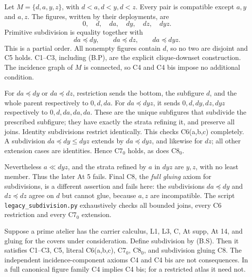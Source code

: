 \begin{counterexample}
\label{SA21-B-C-carriers}
Let \(M=\{d,a,y,z\}\), with \(d<a,d<y,d<z\).
Every pair is compatible except \(a,y\) and \(a,z\).
The figures, written by their deployments, are
\[
 0,\quad d,\quad da,\quad dy,\quad dz,\quad dyz.
\]
Primitive subdivision is equality together with
\[
 da\preceq dy,\qquad da\preceq dz,\qquad da\preceq dyz.
\]
This is a partial order. All nonempty figures contain \(d\),
so no two are disjoint and C5 holds. C1--C3, including (B.P),
are the explicit clique-downset construction. The incidence
graph of \(M\) is connected, so C4 and C4 bis impose no additional
condition.

For \(da\preceq dy\) or \(da\preceq dz\), restriction sends the
bottom, the subfigure \(d\), and the whole parent respectively to
\(0,d,da\). For \(da\preceq dyz\), it sends
\(0,d,dy,dz,dyz\) respectively to \(0,d,da,da,da\).
These are the unique subfigures that subdivide the prescribed
subfigure; they have exactly the strata refining it, and preserve
all joins. Identity subdivisions restrict identically. This checks
C6(a,b,c) completely. A subdivision \(da\preceq dy\leq dyz\)
extends by \(da\preceq dyz\), and likewise for \(dz\); all other
extension cases are identities. Hence C7\(_0\) holds, as does
C8\(_0\).

Nevertheless \(a\ll dyz\), and the strata refined by \(a\) in
\(dyz\) are \(y,z\), with no least member. Thus the later At 5
fails. Final C8, the \emph{full gluing} axiom for subdivisions,
is a different assertion and fails here: the subdivisions
\(da\preceq dy\) and \(dz\preceq dz\) agree on \(d\) but cannot
glue, because \(a,z\) are incompatible.
The script \texttt{legacy\_subdivision.py} exhaustively checks all
bounded joins, every C6 restriction and every C7\(_0\) extension.
\end{counterexample}

\begin{proposition}
\label{SA21-B-modern-C}
Suppose a prime atelier has the carrier calculus, L1, L3, C,
At supp, At 14, and gluing for the covers under consideration.
Define subdivision by (B.S). Then it satisfies C1--C3, C5,
literal C6(a,b,c), C7\(_0\), C8\(_0\), and subdivision gluing C8.
The independent incidence-component axioms C4 and C4 bis are not
consequences. In a full canonical figure family C4 implies C4 bis;
for a restricted atlas it need not.
\end{proposition}

